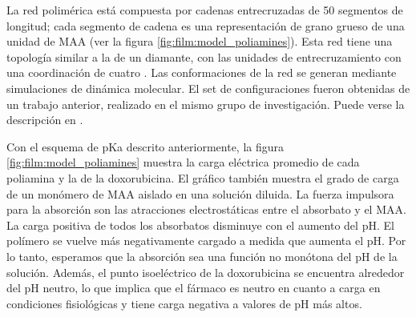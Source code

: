 La red polim\'erica est\'a compuesta por cadenas entrecruzadas de 50 segmentos de longitud; cada segmento de cadena es una representación de grano grueso de una unidad de MAA (ver la figura \ref{fig:film:model_poliamines}). Esta red tiene una topolog\'ia similar a la de un diamante, con las unidades de entrecruzamiento con una coordinaci\'on de cuatro . Las conformaciones de la red se generan mediante simulaciones de din\'amica molecular. El set de configuraciones fueron obtenidas de un trabajo anterior, realizado en el mismo grupo de investigaci\'on. Puede verse la descripci\'on en \addcite[Hagemann2018].



Con el esquema de pKa descrito anteriormente, la figura \ref{fig:film:model_poliamines} muestra la carga el\'ectrica promedio de cada poliamina y la de la doxorubicina. El gr\'afico tambi\'en muestra el grado de carga de un mon\'omero de MAA aislado en una soluci\'on diluida. La fuerza impulsora para la absorci\'on son las atracciones electrost\'aticas entre el absorbato y el MAA. La carga positiva de todos los absorbatos disminuye con el aumento del pH. El pol\'imero se vuelve m\'as negativamente cargado a medida que aumenta el pH. Por lo tanto, esperamos que la absorci\'on sea una funci\'on no mon\'otona del pH de la soluci\'on. Adem\'as, el punto isoel\'ectrico de la doxorubicina se encuentra alrededor del pH neutro, lo que implica que el f\'armaco es neutro en cuanto a carga en condiciones fisiol\'ogicas y tiene carga negativa a valores de pH m\'as altos.



